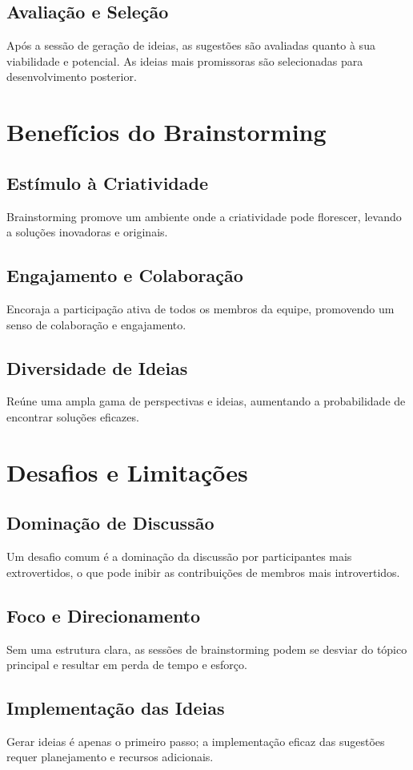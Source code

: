 \documentclass{ufersa}
\begin{document}
\subsection{Avaliação e Seleção}
Após a sessão de geração de ideias, as sugestões são avaliadas quanto à sua viabilidade e potencial. As ideias mais promissoras são selecionadas para desenvolvimento posterior.

\section{Benefícios do Brainstorming}
\subsection{Estímulo à Criatividade}
Brainstorming promove um ambiente onde a criatividade pode florescer, levando a soluções inovadoras e originais.

\subsection{Engajamento e Colaboração}
Encoraja a participação ativa de todos os membros da equipe, promovendo um senso de colaboração e engajamento.

\subsection{Diversidade de Ideias}
Reúne uma ampla gama de perspectivas e ideias, aumentando a probabilidade de encontrar soluções eficazes.

\section{Desafios e Limitações}
\subsection{Dominação de Discussão}
Um desafio comum é a dominação da discussão por participantes mais extrovertidos, o que pode inibir as contribuições de membros mais introvertidos.

\subsection{Foco e Direcionamento}
Sem uma estrutura clara, as sessões de brainstorming podem se desviar do tópico principal e resultar em perda de tempo e esforço.

\subsection{Implementação das Ideias}
Gerar ideias é apenas o primeiro passo; a implementação eficaz das sugestões requer planejamento e recursos adicionais.
\end{document}
